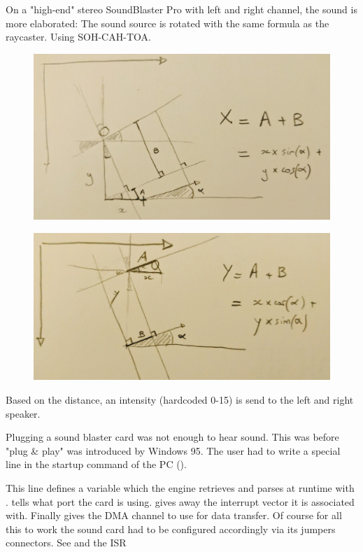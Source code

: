 On a "high-end" stereo SoundBlaster Pro with left and right channel, the sound is more elaborated: The sound source is rotated with the same formula as the raycaster. Using SOH-CAH-TOA.\\
\par
\begin{figure}[H]
\centering
 \includegraphics[width=\textwidth]{imgs/drawings/audio_y_rotate.png}
 \end{figure}
 \par
 \begin{figure}[H]
\centering
 \includegraphics[width=\textwidth]{imgs/drawings/audio_x_rotate.png}
 \end{figure}
\par
Based on the distance, an intensity (hardcoded 0-15) is send to the left and right speaker.\\
\par
{} Plugging a sound blaster card was not enough to hear sound. This was before "plug \& play" was introduced by Windows 95. The user had to write a special line in the startup command of the PC ().\\
\par 
\begin{minipage}{\textwidth}

\end{minipage}
\par
This line defines a variable  which the engine retrieves and parses at runtime with .  tells what port the card is using.  gives away the interrupt vector it is associated with. Finally  gives the DMA channel to use for data transfer. Of course for all this to work the sound card had to be configured accordingly via its jumpers connectors.
See  and the ISR  




